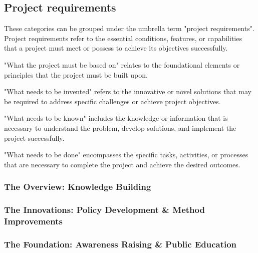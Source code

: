 \subsection{Project requirements}



These categories can be grouped under the umbrella term "project requirements". Project requirements refer to the essential conditions, features, or capabilities that a project must meet or possess to achieve its objectives successfully.

"What the project must be based on" relates to the foundational elements or principles that the project must be built upon.

"What needs to be invented" refers to the innovative or novel solutions that may be required to address specific challenges or achieve project objectives.

"What needs to be known" includes the knowledge or information that is necessary to understand the problem, develop solutions, and implement the project successfully.

"What needs to be done" encompasses the specific tasks, activities, or processes that are necessary to complete the project and achieve the desired outcomes.


\subsubsection{The Overview: Knowledge Building}


\subsubsection{The Innovations: Policy Development \& Method Improvements}%


\subsubsection{The Foundation: Awareness Raising \& Public Education}%


